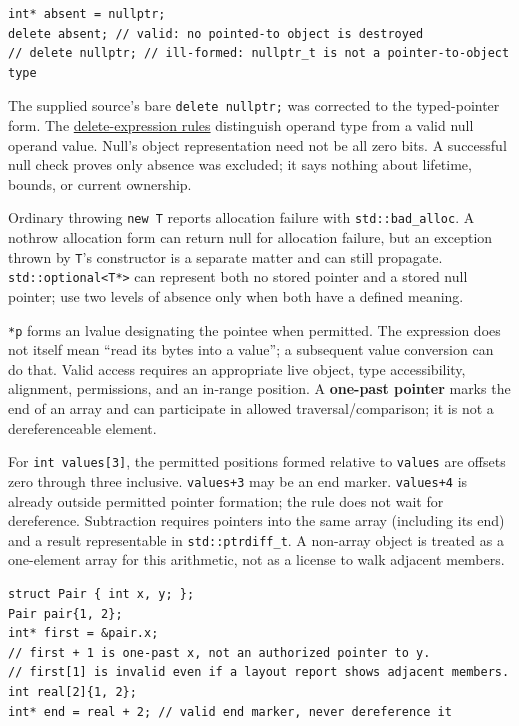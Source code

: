 \begin{verbatim}
int* absent = nullptr;
delete absent; // valid: no pointed-to object is destroyed
// delete nullptr; // ill-formed: nullptr_t is not a pointer-to-object type
\end{verbatim}

The supplied source's bare \texttt{delete\ nullptr;} was corrected to the typed-pointer form. The \href{https://eel.is/c++draft/expr.delete}{delete-expression rules} distinguish operand type from a valid null operand value. Null's object representation need not be all zero bits. A successful null check proves only absence was excluded; it says nothing about lifetime, bounds, or current ownership.

Ordinary throwing \texttt{new\ T} reports allocation failure with \texttt{std::bad\_alloc}. A nothrow allocation form can return null for allocation failure, but an exception thrown by \texttt{T}'s constructor is a separate matter and can still propagate. \texttt{std::optional\textless{}T*\textgreater{}} can represent both no stored pointer and a stored null pointer; use two levels of absence only when both have a defined meaning.

\texttt{*p} forms an lvalue designating the pointee when permitted. The expression does not itself mean ``read its bytes into a value''; a subsequent value conversion can do that. Valid access requires an appropriate live object, type accessibility, alignment, permissions, and an in-range position. A \textbf{one-past pointer} marks the end of an array and can participate in allowed traversal/comparison; it is not a dereferenceable element.

For \texttt{int\ values{[}3{]}}, the permitted positions formed relative to \texttt{values} are offsets zero through three inclusive. \texttt{values+3} may be an end marker. \texttt{values+4} is already outside permitted pointer formation; the rule does not wait for dereference. Subtraction requires pointers into the same array (including its end) and a result representable in \texttt{std::ptrdiff\_t}. A non-array object is treated as a one-element array for this arithmetic, not as a license to walk adjacent members.

\begin{verbatim}
struct Pair { int x, y; };
Pair pair{1, 2};
int* first = &pair.x;
// first + 1 is one-past x, not an authorized pointer to y.
// first[1] is invalid even if a layout report shows adjacent members.
int real[2]{1, 2};
int* end = real + 2; // valid end marker, never dereference it
\end{verbatim}

